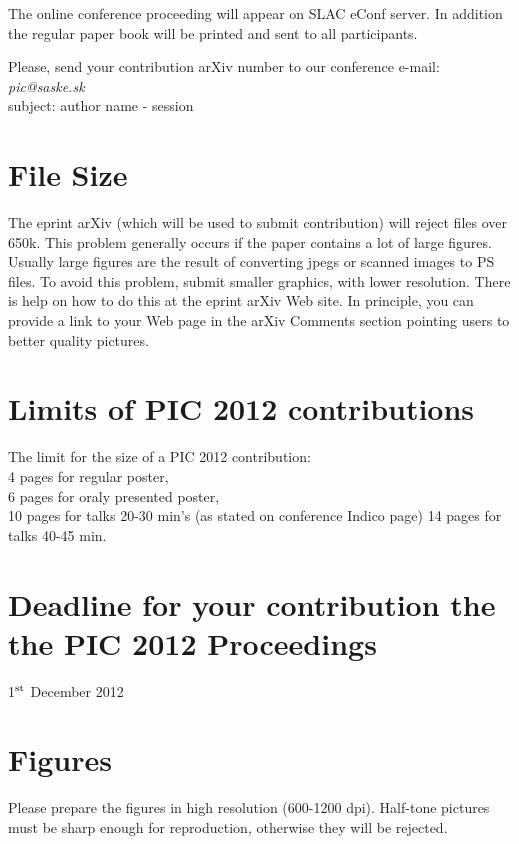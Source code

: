 \documentclass{pic2012}
\begin{document}
The online conference proceeding will appear on SLAC eConf server.
In addition the regular paper book will be printed and sent to all participants.

Please, send your contribution arXiv number to our conference e-mail: \\
{\it pic@saske.sk} \\
subject: author name - session

\section{File Size}
The eprint arXiv (which will be used to submit contribution) will reject files over 650k. This problem generally occurs if the paper contains a lot of large figures. Usually large figures are the result of converting jpegs or scanned images to PS files. To avoid this problem, submit smaller graphics, with lower resolution. There is help on how to do this at the eprint arXiv Web site. In principle, you can provide a link to your Web page in the arXiv  Comments  section pointing users to better quality pictures. 

\section{Limits of PIC 2012 contributions}
The limit for the size of a PIC 2012 contribution: \\
4 pages for regular poster, \\
6 pages for oraly presented poster, \\
10 pages for talks 20-30 min's (as stated on conference Indico page)
14 pages for talks 40-45 min.

\section{Deadline for your contribution the the PIC 2012 Proceedings}
1$^{\rm st}$ December 2012

\section{Figures} 
Please prepare the figures in high resolution
(600-1200 dpi). Half-tone pictures must be sharp
enough for reproduction, otherwise they will be rejected.
\end{document}
